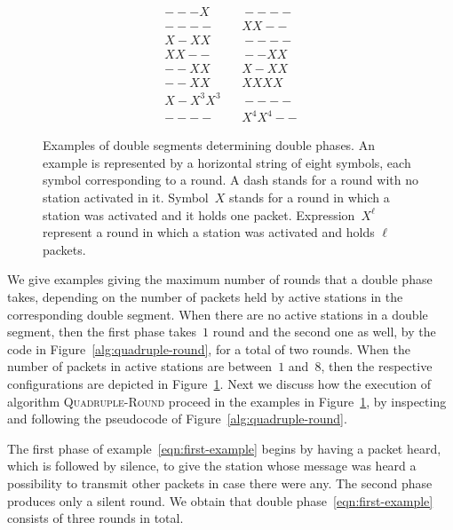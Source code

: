 \documentclass[11pt]{article}
\newcommand{\FFF}{\vspace*{\bigskipamount}}
\newlength{\captionwidth}
\begin{document}
\begin{figure}[t]
\begin{center}
\begin{minipage}{\examplewidth}
\begin{align}
\label{eqn:first-example}
 - - - X &\ \ \ \ - - - -  \\
 \label{eqn:second-example}
- - - - &\ \ \ \  X X - - \\
\label{eqn:third-example}
X - X X &\ \ \ \ - - - -  \\
\label{eqn:fourth-example}
X X - -  &\ \ \ \ - - X X \\
\label{eqn:fifth-example}
 - - X X &\ \ \ \ X - X X   \\
 \label{eqn:sixth-example}
-  - X X &\ \ \ \ X X X X  \\
\label{eqn:seventh-example}
X -  X^3 X^3 &\ \ \ \ - - - - \\
\label{eqn:eighth-example}
- - - -  &\ \ \ \  X^4 X^4 - -
\end{align}
\end{minipage}

\FFF

\parbox{\captionwidth}{\caption{\label{fig:quadruple-examples}
Examples of double segments determining double phases.
An example is represented by a horizontal string of eight symbols, each symbol corresponding to a round.
A dash stands for a round with no station activated in it.
Symbol~$X$ stands for a round in which a station was activated and it holds one packet.
Expression~$X^\ell$ represent a round in which a station was activated and holds $\ell$ packets.
}}
\end{center}
\end{figure}

We give examples giving the maximum number of rounds that a double phase takes, depending on the number of packets held by active stations in the corresponding double segment.
When there are no active stations in a double segment, then the first phase takes~$1$ round and the second one as well, by the code in Figure~\ref{alg:quadruple-round}, for a total of two rounds.
When the number of packets in active stations are between~$1$ and~$8$, then the respective configurations are depicted in Figure~\ref{fig:quadruple-examples}.
Next we discuss how the execution of algorithm \textsc{Quadruple-Round} proceed in the examples in Figure~\ref{fig:quadruple-examples}, by inspecting and following the pseudocode of Figure~\ref{alg:quadruple-round}.


The first phase of example~\eqref{eqn:first-example} begins by having a packet heard, which is followed by silence, to give the station whose message was heard a possibility to transmit other packets in case there were any. 
The second phase produces only a silent round.
We obtain that double phase~\eqref{eqn:first-example} consists of three rounds in total.
\end{document}
